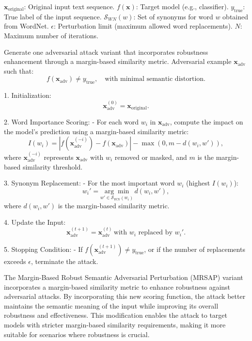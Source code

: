 $\mathbf{x}_{\text{original}}$: Original input text sequence.  
$f(\mathbf{x})$: Target model (e.g., classifier).  
$y_{\text{true}}$: True label of the input sequence.  
$\mathcal{S}_{WN}(w)$: Set of synonyms for word $w$ obtained from WordNet.  
$\epsilon$: Perturbation limit (maximum allowed word replacements).  
$N$: Maximum number of iterations.

Generate one adversarial attack variant that incorporates robustness enhancement through a margin-based similarity metric. 
Adversarial example $\mathbf{x}_{\text{adv}}$ such that:  
\[
f(\mathbf{x}_{\text{adv}}) \neq y_{\text{true}}, \quad \text{with minimal semantic distortion}.
\]


1. Initialization:  
   \[
   \mathbf{x}_{\text{adv}}^{(0)} = \mathbf{x}_{\text{original}}.
   \]

2. Word Importance Scoring:  
   - For each word $w_i$ in $\mathbf{x}_{\text{adv}}$, compute the impact on the model's prediction using a margin-based similarity metric:  
     \[
     I(w_i) = |f(\mathbf{x}_{\text{adv}}^{(-i)}) - f(\mathbf{x}_{\text{adv}})| - \max(0, m - d(w_i, w')),
     \]  
     where $\mathbf{x}_{\text{adv}}^{(-i)}$ represents $\mathbf{x}_{\text{adv}}$ with $w_i$ removed or masked, and $m$ is the margin-based similarity threshold.

3. Synonym Replacement:  
   - For the most important word $w_i$ (highest $I(w_i)$):  
     \[
     w_i' = \underset{w' \in \mathcal{S}_{WN}(w_i)}{\arg \min} \, d(w_i, w'),
     \]  
     where $d(w_i, w')$ is the margin-based similarity metric.

4. Update the Input:  
   \[
   \mathbf{x}_{\text{adv}}^{(t+1)} = \mathbf{x}_{\text{adv}}^{(t)} \, \text{with } w_i \text{ replaced by } w_i'.
   \]

5. Stopping Condition:  
   - If $f(\mathbf{x}_{\text{adv}}^{(t+1)}) \neq y_{\text{true}}$, or if the number of replacements exceeds $\epsilon$, terminate the attack.

The Margin-Based Robust Semantic Adversarial Perturbation (MRSAP) variant incorporates a margin-based similarity metric to enhance robustness against adversarial attacks. By incorporating this new scoring function, the attack better maintains the semantic meaning of the input while improving its overall robustness and effectiveness. This modification enables the attack to target models with stricter margin-based similarity requirements, making it more suitable for scenarios where robustness is crucial.